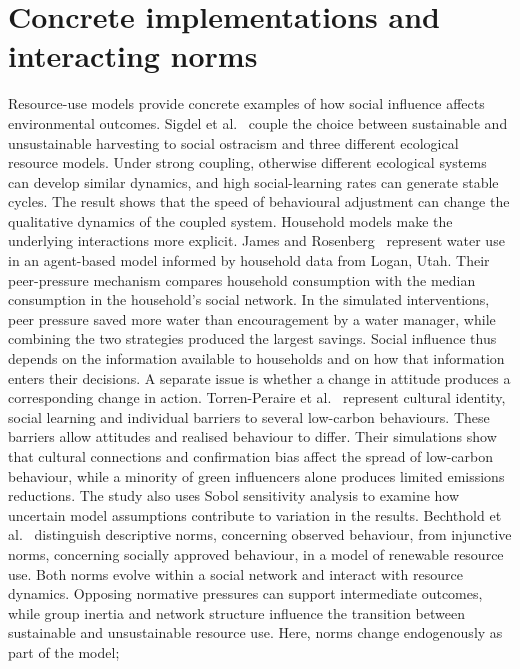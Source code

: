 \section{Concrete implementations and interacting norms}
\label{sec:related-norm-implementations}

Resource-use models provide concrete examples of how social influence affects environmental outcomes.
Sigdel et al.~\cite{sigdel2019convergence} couple the choice between sustainable and unsustainable
harvesting to social ostracism and three different ecological resource models. Under strong coupling,
otherwise different ecological systems can develop similar dynamics, and high social-learning rates can
generate stable cycles. The result shows that the speed of behavioural adjustment can change the
qualitative dynamics of the coupled system. Household models make the underlying interactions more
explicit. James and Rosenberg~\cite{james2022water} represent water use in an agent-based model informed
by household data from Logan, Utah. Their peer-pressure mechanism compares household consumption with the
median consumption in the household's social network. In the simulated interventions, peer pressure saved
more water than encouragement by a water manager, while combining the two strategies produced the largest
savings. Social influence thus depends on the information available to households and on how that
information enters their decisions. A separate issue is whether a change in attitude produces a
corresponding change in action. Torren-Peraire et al.~\cite{torrenperaire2024cultural} represent cultural
identity, social learning and individual barriers to several low-carbon behaviours. These barriers allow
attitudes and realised behaviour to differ. Their simulations show that cultural connections and
confirmation bias affect the spread of low-carbon behaviour, while a minority of green influencers alone
produces limited emissions reductions. The study also uses Sobol sensitivity analysis to examine how
uncertain model assumptions contribute to variation in the results. Bechthold et
al.~\cite{bechthold2025norms} distinguish descriptive norms, concerning observed behaviour, from
injunctive norms, concerning socially approved behaviour, in a model of renewable resource use. Both
norms evolve within a social network and interact with resource dynamics. Opposing normative pressures
can support intermediate outcomes, while group inertia and network structure influence the transition
between sustainable and unsustainable resource use. Here, norms change endogenously as part of the model;
